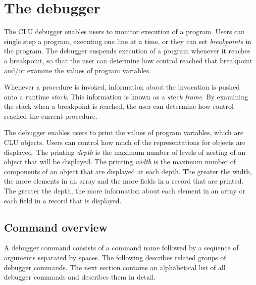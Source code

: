 \section{The debugger}

The CLU debugger enables users to monitor execution of a program.  Users can
single step a program, executing one line at a time, or they can set {\em
breakpoints} in the program.  The debugger suspends execution of a program
whenever it reaches a breakpoint, so that the user can determine how control
reached that breakpoint and/or examine the values of program variables.

Whenever a procedure is invoked, information about the invocation is pushed
onto a runtime {\em stack}.  This information is known as a {\em stack frame}.
By examining the stack when a breakpoint is reached, the user can determine how
control reached the current procedure.

The debugger enables users to print the values of program variables, which are
CLU objects.  Users can control how much of the representations for objects are
displayed.  The printing {\em depth} is the maximum number of levels of nesting
of an object that will be displayed.  The printing {\em width} is the maximum
number of components of an object that are displayed at each depth.  The
greater the width, the more elements in an array and the more fields in a
record that are printed.  The greater the depth, the more information about
each element in an array or each field in a record that is displayed.

\subsection{Command overview}

A debugger command consists of a command name followed by a sequence of
arguments separated by spaces.  The following describes related groups of
debugger commands.  The next section contains an alphabetical list of all
debugger commands and describes them in detail.

